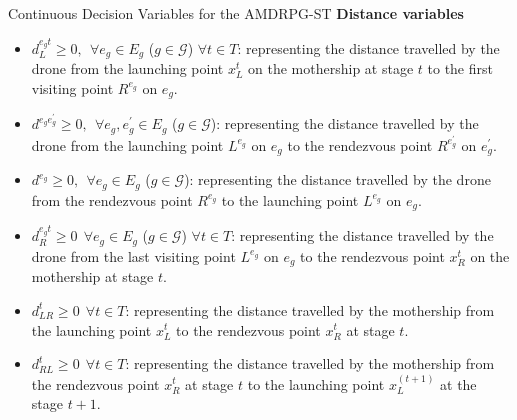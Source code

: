 \documentclass[slidestop,usepdftitle=false,10pt]{beamer}
\begin{document}
    \begin{frame}{Continuous Decision Variables for the AMDRPG-ST}
    \textbf{Distance variables}
    \begin{itemize}
        \small
        \item $d_L^{e_gt} \geq 0, \:\: \forall e_g \in E_g$ ($g \in \mathcal{G}$) $\forall t \in T$: representing the distance travelled by the drone from the launching point $x_L^t$ on the mothership at stage $t$ to the first visiting point $R^{e_g}$ on $e_g$.
        \item $d^{e_ge^\prime_g} \geq 0, \:\: \forall e_g, e^\prime_g \in E_g $ ($g \in \mathcal{G}$): representing the distance travelled by the drone from the launching
        point $L^{e_g}$ on $e_g$ to the rendezvous point $R^{e^\prime_g}$ on $e^\prime_g$.
        \item $d^{e_g} \geq 0, \:\: \forall e_g \in E_g$ ($g \in \mathcal{G}$): representing the distance travelled by the drone from the rendezvous point $R^{e_g}$ to the launching point $L^{e_g}$ on $e_g$. 
        \item $d_R^{e_gt} \geq 0 \:\: \forall e_g \in E_g$ ($g \in \mathcal{G}$) $\forall t \in T$: representing the distance travelled by the drone from the last
        visiting point $L^{e_g}$ on $e_g$ to the rendezvous point $x_R^t$ on the mothership at stage $t$.
        \item $d_{LR}^t \geq 0 \:\: \forall t \in T$: representing the distance travelled by the mothership from the launching point $x_L^t$ to the rendezvous point $x_R^t$ at stage $t$.
        \item $d_{RL}^t \geq 0 \:\: \forall t \in T$: representing the distance travelled by the mothership from the rendezvous point $x_R^t$ at stage $t$ to the launching point $x_L^{(t+1)}$ at the stage $t+1$.
    \end{itemize}
	\end{frame}
	
\end{document}
